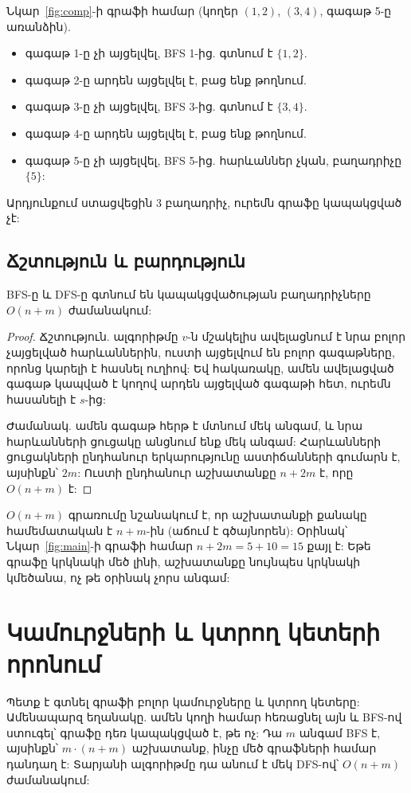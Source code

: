 \begin{example}
Նկար~\ref{fig:comp}-ի գրաֆի համար (կողեր $(1,2)$, $(3,4)$, գագաթ 5-ը առանձին).
\begin{itemize}
  \item գագաթ 1-ը չի այցելվել, BFS 1-ից. գտնում է $\{1,2\}$.
  \item գագաթ 2-ը արդեն այցելվել է, բաց ենք թողնում.
  \item գագաթ 3-ը չի այցելվել, BFS 3-ից. գտնում է $\{3,4\}$.
  \item գագաթ 4-ը արդեն այցելվել է, բաց ենք թողնում.
  \item գագաթ 5-ը չի այցելվել, BFS 5-ից. հարևաններ չկան, բաղադրիչը $\{5\}$:
\end{itemize}
Արդյունքում ստացվեցին 3 բաղադրիչ, ուրեմն գրաֆը կապակցված չէ:
\end{example}

\subsection{Ճշտություն և բարդություն}

\begin{theorem}
BFS-ը և DFS-ը գտնում են կապակցվածության բաղադրիչները $O(n+m)$ ժամանակում:
\end{theorem}

\begin{proof}
Ճշտություն. ալգորիթմը $v$-ն մշակելիս ավելացնում է նրա բոլոր չայցելված հարևաններին, ուստի այցելվում են բոլոր գագաթները, որոնց կարելի է հասնել ուղիով: Եվ հակառակը, ամեն ավելացված գագաթ կապված է կողով արդեն այցելված գագաթի հետ, ուրեմն հասանելի է $s$-ից:

Ժամանակ. ամեն գագաթ հերթ է մտնում մեկ անգամ, և նրա հարևանների ցուցակը անցնում ենք մեկ անգամ: Հարևանների ցուցակների ընդհանուր երկարությունը աստիճանների գումարն է, այսինքն՝ $2m$: Ուստի ընդհանուր աշխատանքը $n+2m$ է, որը $O(n+m)$ է:
\end{proof}

$O(n+m)$ գրառումը նշանակում է, որ աշխատանքի քանակը համեմատական է $n+m$-ին (աճում է գծայնորեն): Օրինակ՝ Նկար~\ref{fig:main}-ի գրաֆի համար $n+2m=5+10=15$ քայլ է: Եթե գրաֆը կրկնակի մեծ լինի, աշխատանքը նույնպես կրկնակի կմեծանա, ոչ թե օրինակ չորս անգամ:

\section{Կամուրջների և կտրող կետերի որոնում}

Պետք է գտնել գրաֆի բոլոր կամուրջները և կտրող կետերը: Ամենապարզ եղանակը. ամեն կողի համար հեռացնել այն և BFS-ով ստուգել՝ գրաֆը դեռ կապակցված է, թե ոչ: Դա $m$ անգամ BFS է, այսինքն՝ $m\cdot(n+m)$ աշխատանք, ինչը մեծ գրաֆների համար դանդաղ է: Տարյանի ալգորիթմը դա անում է մեկ DFS-ով՝ $O(n+m)$ ժամանակում:

